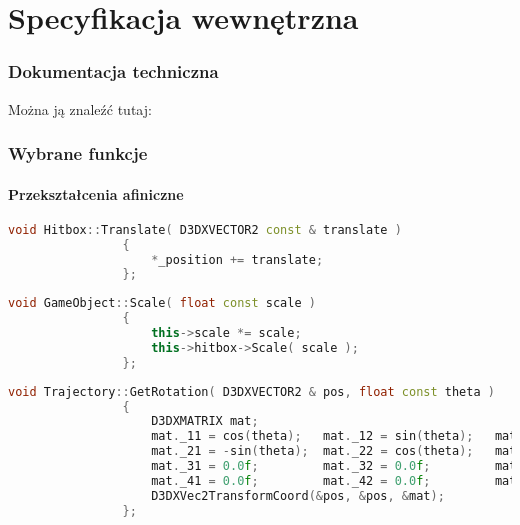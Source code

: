 \newpage
\part{\huge \textbf{Specyfikacja wewnętrzna}}
	\section{Dokumentacja techniczna}
		Można ją znaleźć tutaj: 
		
	\section{Wybrane funkcje}
		\subsection{Przekształcenia afiniczne}
			\begin{lstlisting}[language=C++]
				void Hitbox::Translate( D3DXVECTOR2 const & translate )
				{
					*_position += translate;
				};
			\end{lstlisting}
			\begin{lstlisting}[language=C++]
				void GameObject::Scale( float const scale )
				{
					this->scale *= scale;
					this->hitbox->Scale( scale );
				};
			\end{lstlisting}
			\begin{lstlisting}[language=C++]
				void Trajectory::GetRotation( D3DXVECTOR2 & pos, float const theta )
				{
					D3DXMATRIX mat; 
					mat._11 = cos(theta);	mat._12 = sin(theta);	mat._13 = 0.0f;		mat._14 = 0.0f;
					mat._21 = -sin(theta);	mat._22 = cos(theta);	mat._23 = 0.0f;		mat._24 = 0.0f;
					mat._31 = 0.0f;			mat._32 = 0.0f;			mat._33 = 1.0f;		mat._34 = 0.0f;
					mat._41 = 0.0f;			mat._42 = 0.0f;			mat._43 = 0.0f;		mat._44 = 1.0f;
					D3DXVec2TransformCoord(&pos, &pos, &mat);
				};
			\end{lstlisting}
	
